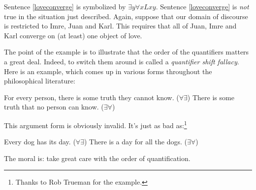 Sentence \ref{loveconverge} is symbolized by $\exists y \forall x Lxy$. Sentence \ref{loveconverge} is \emph{not} true in the situation just described. Again, suppose that our domain of discourse is restricted to Imre, Juan and Karl. This requires that all of Juan, Imre and Karl converge on (at least) one object of love.

The point of the example is to illustrate that the order of the quantifiers matters a great deal. Indeed, to switch them around is called a \emph{quantifier shift fallacy}. Here is an example, which comes up in various forms throughout the philosophical literature:
	\begin{earg}
		\prem For every person, there is some truth they cannot know. \hfill ($\forall \exists$)
		\conc There is some truth that no person can know. \hfill ($\exists \forall$)
	\end{earg}
This argument form is obviously invalid. It's just as bad as:\footnote{Thanks to Rob Trueman for the example.}
	\begin{earg}
		\prem Every dog has its day. \hfill ($\forall \exists$)
		\conc There is a day for all the dogs. \hfill ($\exists \forall$)
	\end{earg}



The moral is: take great care with the order of quantification.


